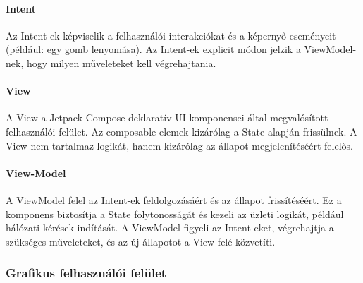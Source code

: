 \paragraph{Intent}
Az Intent-ek képviselik a felhasználói interakciókat és a képernyő eseményeit (például: egy gomb lenyomása). 
Az Intent-ek explicit módon jelzik a ViewModel-nek, hogy milyen műveleteket kell végrehajtania.

\paragraph{View}
A View a Jetpack Compose deklaratív UI komponensei által megvalósított felhasználói felület.
Az composable elemek kizárólag a State alapján frissülnek.
A View nem tartalmaz logikát, hanem kizárólag az állapot megjelenítéséért felelős.


\paragraph{View-Model}
A ViewModel felel az Intent-ek feldolgozásáért és az állapot frissítéséért. 
Ez a komponens biztosítja a State folytonosságát és kezeli az üzleti logikát,
például hálózati kérések indítását.
A ViewModel figyeli az Intent-eket, végrehajtja a szükséges műveleteket, és az új állapotot a View felé közvetíti.




\subsubsection{Grafikus felhasználói felület}
    




